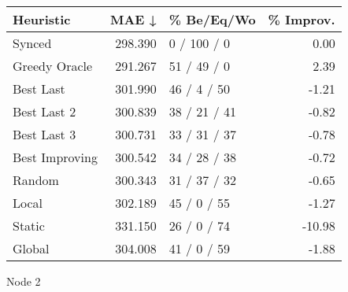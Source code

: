 \begin{tabular}{lrlr}
\toprule
\textbf{Heuristic} & \textbf{MAE ↓} & \textbf{\% Be/Eq/Wo} & \textbf{\% Improv.} \\
\midrule
            Synced &        298.390 &          0 / 100 / 0 &                0.00 \\
     Greedy Oracle &        291.267 &          51 / 49 / 0 &                2.39 \\
         Best Last &        301.990 &          46 / 4 / 50 &               -1.21 \\
       Best Last 2 &        300.839 &         38 / 21 / 41 &               -0.82 \\
       Best Last 3 &        300.731 &         33 / 31 / 37 &               -0.78 \\
    Best Improving &        300.542 &         34 / 28 / 38 &               -0.72 \\
            Random &        300.343 &         31 / 37 / 32 &               -0.65 \\
             Local &        302.189 &          45 / 0 / 55 &               -1.27 \\
            Static &        331.150 &          26 / 0 / 74 &              -10.98 \\
            Global &        304.008 &          41 / 0 / 59 &               -1.88 \\
\bottomrule
\end{tabular}
\caption{Node 2}
\label{tab:non_lr05_le2_bs2_2}
